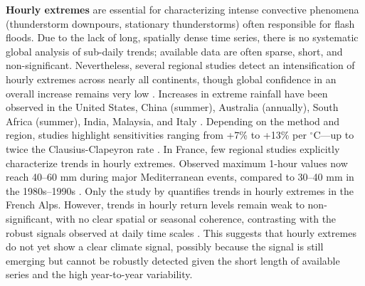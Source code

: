 \documentclass[hess, manuscript]{copernicus}
\begin{document}
\textbf{Hourly extremes} are
essential for characterizing intense convective phenomena (thunderstorm
downpours, stationary thunderstorms) often responsible for flash floods.
Due to the lack of long, spatially dense time series, there is no
systematic global analysis of sub-daily trends; available data are often
sparse, short, and non-significant. Nevertheless, several regional
studies detect an intensification of hourly extremes across nearly all
continents, though global confidence in an overall increase remains very
low \citep{IPCC2021}. Increases in extreme rainfall have been observed in the
United States, China (summer), Australia (annually), South Africa
(summer), India, Malaysia, and Italy \citep{IPCC2021}. Depending on the method and
region, studies highlight sensitivities ranging from +7\% to +13\% per
$^\circ$C---up to twice the Clausius-Clapeyron rate \citep{molnar2015relation}. In
France, few regional studies explicitly characterize trends in
hourly extremes. Observed maximum 1-hour values now reach 40--60 mm
during major Mediterranean events, compared to 30--40 mm in the
1980s--1990s \citep{meteofrance2024}. Only the study by \cite{Berghald2025} quantifies trends in hourly extremes in the French Alps.
However, trends in hourly return levels remain weak to non-significant,
with no clear spatial or seasonal coherence, contrasting with the robust
signals observed at daily time scales \citep{Soubeyroux01022015}. This suggests that hourly extremes do not yet show a clear climate signal, possibly because the signal is still emerging but cannot be robustly detected given the short length of available series and the high year-to-year variability.
\end{document}
